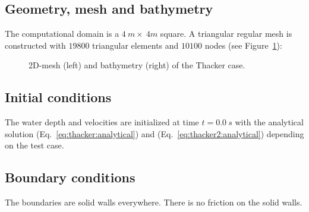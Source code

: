 \subsection{Geometry, mesh and bathymetry}

The computational domain is a $4~m \times~4m$ square.
A triangular regular mesh is constructed with $19800$ triangular elements and
$10100$ nodes (see Figure~\ref{fig:thacker:Mesh}):

\begin{figure}[H]
\begin{minipage}[t]{0.45\textwidth}
 \centering
\end{minipage}%
\begin{minipage}[t]{0.55\textwidth}
 \centering
\end{minipage}
  \caption{2D-mesh (left) and bathymetry (right) of the Thacker case.}\label{fig:thacker:Mesh}
\end{figure}

%

\subsection{Initial conditions}

The water depth and velocities are initialized  at time $t=0.0~s$ with the analytical solution (Eq.~\ref{eq:thacker:analytical}) and  (Eq.~\ref{eq:thacker2:analytical}) depending on the test case.

\subsection{Boundary conditions}

The boundaries are solid walls everywhere. There is no friction on the solid walls.

